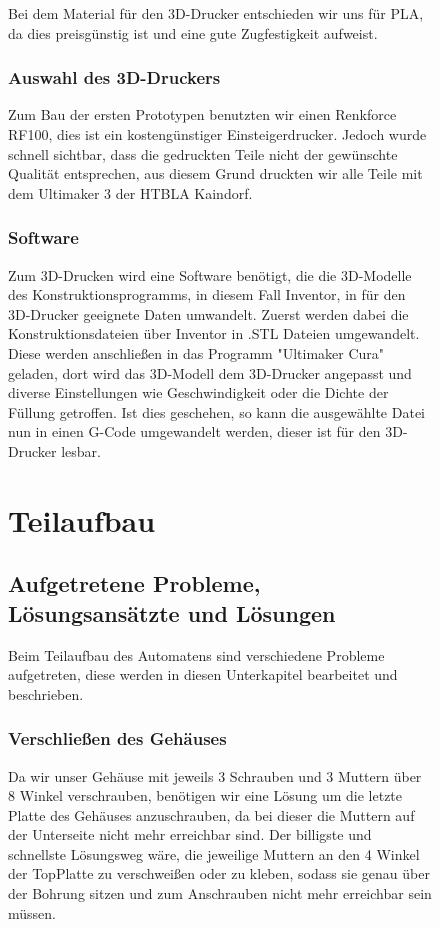 \begin{figure}
Bei dem Material für den 3D-Drucker entschieden wir uns für PLA, da dies preisgünstig ist und eine gute Zugfestigkeit aufweist.

\subsubsection{Auswahl des 3D-Druckers}
Zum Bau der ersten Prototypen benutzten wir einen Renkforce RF100, dies ist ein kostengünstiger Einsteigerdrucker.
Jedoch wurde schnell sichtbar, dass die gedruckten Teile nicht der gewünschte Qualität entsprechen, aus diesem Grund
druckten wir alle Teile mit dem Ultimaker 3 der HTBLA Kaindorf.

\subsubsection{Software}
Zum 3D-Drucken wird eine Software benötigt, die die 3D-Modelle des Konstruktionsprogramms, in diesem Fall Inventor,
in für den 3D-Drucker geeignete Daten umwandelt.
Zuerst werden dabei die Konstruktionsdateien über Inventor in .STL Dateien umgewandelt. Diese werden anschließen in das
Programm "Ultimaker Cura" geladen, dort wird das 3D-Modell dem 3D-Drucker angepasst und diverse Einstellungen wie
Geschwindigkeit oder die Dichte der Füllung getroffen. Ist dies geschehen, so kann die ausgewählte Datei nun in einen
G-Code umgewandelt werden, dieser ist für den 3D-Drucker lesbar.

\section{Teilaufbau}

\subsection{Aufgetretene Probleme, Lösungsansätzte und Lösungen}
Beim Teilaufbau des Automatens sind verschiedene Probleme aufgetreten, diese werden in diesen Unterkapitel bearbeitet und beschrieben.

\subsubsection{Verschließen des Gehäuses}
Da wir unser Gehäuse mit jeweils 3 Schrauben und 3 Muttern über 8 Winkel verschrauben, benötigen
wir eine Lösung um die letzte Platte des Gehäuses anzuschrauben, da bei dieser die Muttern
auf der Unterseite nicht mehr erreichbar sind. Der billigste und schnellste Lösungsweg wäre,
die jeweilige Muttern an den 4 Winkel der TopPlatte zu verschweißen oder zu kleben, sodass sie genau über der
Bohrung sitzen und zum Anschrauben nicht mehr erreichbar sein müssen.


\end{figure}
